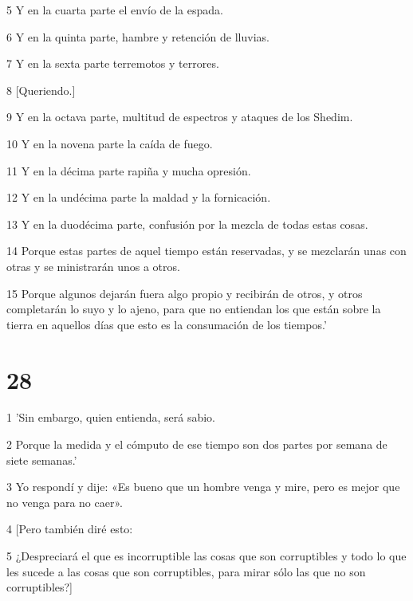 \par 5 Y en la cuarta parte el envío de la espada.

\par 6 Y en la quinta parte, hambre y retención de lluvias.

\par 7 Y en la sexta parte terremotos y terrores.

\par 8 [Queriendo.]

\par 9 Y en la octava parte, multitud de espectros y ataques de los Shedim.

\par 10 Y en la novena parte la caída de fuego.

\par 11 Y en la décima parte rapiña y mucha opresión.

\par 12 Y en la undécima parte la maldad y la fornicación.

\par 13 Y en la duodécima parte, confusión por la mezcla de todas estas cosas.

\par 14 Porque estas partes de aquel tiempo están reservadas, y se mezclarán unas con otras y se ministrarán unos a otros.

\par 15 Porque algunos dejarán fuera algo propio y recibirán de otros, y otros completarán lo suyo y lo ajeno, para que no entiendan los que están sobre la tierra en aquellos días que esto es la consumación de los tiempos.'

\chapter{28}

\par 1 'Sin embargo, quien entienda, será sabio.

\par 2 Porque la medida y el cómputo de ese tiempo son dos partes por semana de siete semanas.'

\par 3 Yo respondí y dije: «Es bueno que un hombre venga y mire, pero es mejor que no venga para no caer».

\par 4 [Pero también diré esto:

\par 5 ¿Despreciará el que es incorruptible las cosas que son corruptibles y todo lo que les sucede a las cosas que son corruptibles, para mirar sólo las que no son corruptibles?]


